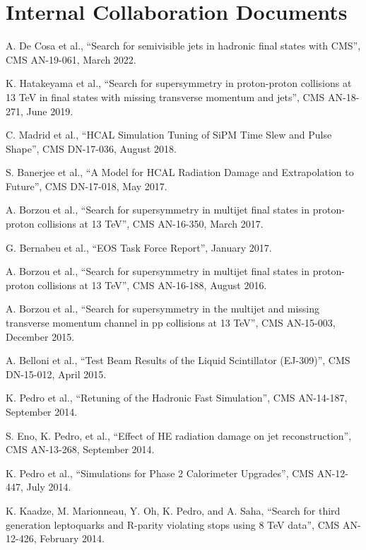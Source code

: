 \ifdefined\longflag
{}
\section{Internal Collaboration Documents}
\begin{description}[leftmargin=12pt,font=\normalfont,labelsep=0em]
\item A. De Cosa et al., ``Search for semivisible jets in hadronic final states with CMS'', CMS AN-19-061, March 2022.
\item K. Hatakeyama et al., ``Search for supersymmetry in proton-proton collisions at 13 TeV in final states with missing transverse momentum and jets'', CMS AN-18-271, June 2019.
\item C. Madrid et al., ``HCAL Simulation Tuning of SiPM Time Slew and Pulse Shape'', CMS DN-17-036, August 2018.
\item S. Banerjee et al., ``A Model for HCAL Radiation Damage and Extrapolation to Future'', CMS DN-17-018, May 2017.
\item A. Borzou et al., ``Search for supersymmetry in multijet final states in proton-proton collisions at 13 TeV'', CMS AN-16-350, March 2017.
\item G. Bernabeu et al., ``EOS Task Force Report'', January 2017.
\item A. Borzou et al., ``Search for supersymmetry in multijet final states in proton-proton collisions at 13 TeV'', CMS AN-16-188, August 2016.
\item A. Borzou et al., ``Search for supersymmetry in the multijet and missing transverse momentum channel in pp collisions at 13 TeV'', CMS AN-15-003, December 2015.
\item A. Belloni et al., ``Test Beam Results of the Liquid Scintillator (EJ-309)'', CMS DN-15-012, April 2015.
\item K. Pedro et al., ``Retuning of the Hadronic Fast Simulation'', CMS AN-14-187, September 2014.
\item S. Eno, K. Pedro, et al., ``Effect of HE radiation damage on jet reconstruction'', CMS AN-13-268, September 2014.
\item K. Pedro et al., ``Simulations for Phase 2 Calorimeter Upgrades'', CMS AN-12-447, July 2014.
\item K. Kaadze, M. Marionneau, Y. Oh, K. Pedro, and A. Saha, ``Search for third generation leptoquarks and R-parity violating stops using 8 TeV data'', CMS AN-12-426, February 2014.
\end{description}
\fi
